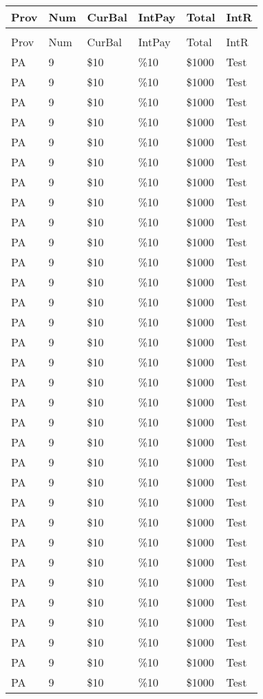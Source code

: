 \documentclass{article}%
\begin{document}
%
\normalsize%
\begin{longtabu}{X[r] X[r] X[r] X[r] X[r] X[r]}%
\textbf{Prov}&\textbf{Num}&\textbf{CurBal}&\textbf{IntPay}&\textbf{Total}&\textbf{IntR}\\%
\hline%
&&&&&\\%
\endhead%
Prov&Num&CurBal&IntPay&Total&IntR\\%
PA&9&\$10&\%10&\$1000&Test\\%
PA&9&\$10&\%10&\$1000&Test\\%
PA&9&\$10&\%10&\$1000&Test\\%
PA&9&\$10&\%10&\$1000&Test\\%
PA&9&\$10&\%10&\$1000&Test\\%
PA&9&\$10&\%10&\$1000&Test\\%
PA&9&\$10&\%10&\$1000&Test\\%
PA&9&\$10&\%10&\$1000&Test\\%
PA&9&\$10&\%10&\$1000&Test\\%
PA&9&\$10&\%10&\$1000&Test\\%
PA&9&\$10&\%10&\$1000&Test\\%
PA&9&\$10&\%10&\$1000&Test\\%
PA&9&\$10&\%10&\$1000&Test\\%
PA&9&\$10&\%10&\$1000&Test\\%
PA&9&\$10&\%10&\$1000&Test\\%
PA&9&\$10&\%10&\$1000&Test\\%
PA&9&\$10&\%10&\$1000&Test\\%
PA&9&\$10&\%10&\$1000&Test\\%
PA&9&\$10&\%10&\$1000&Test\\%
PA&9&\$10&\%10&\$1000&Test\\%
PA&9&\$10&\%10&\$1000&Test\\%
PA&9&\$10&\%10&\$1000&Test\\%
PA&9&\$10&\%10&\$1000&Test\\%
PA&9&\$10&\%10&\$1000&Test\\%
PA&9&\$10&\%10&\$1000&Test\\%
PA&9&\$10&\%10&\$1000&Test\\%
PA&9&\$10&\%10&\$1000&Test\\%
PA&9&\$10&\%10&\$1000&Test\\%
PA&9&\$10&\%10&\$1000&Test\\%
PA&9&\$10&\%10&\$1000&Test\\%
PA&9&\$10&\%10&\$1000&Test\\%
PA&9&\$10&\%10&\$1000&Test\\%

\end{longtabu}
\end{document}
